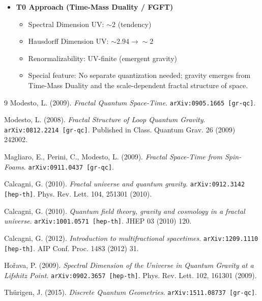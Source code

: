 \begin{itemize}
		\item \textbf{T0 Approach (Time-Mass Duality / FGFT)}
		\begin{itemize}
			\item Spectral Dimension UV: $\sim 2$ (tendency)
			\item Hausdorff Dimension UV: $\sim 2.94 \rightarrow \sim 2$
			\item Renormalizability: UV-finite (emergent gravity)
			\item Special feature: No separate quantization needed; gravity emerges from Time-Mass Duality and the scale-dependent fractal structure of space.
		\end{itemize}
	\end{itemize}
	\begin{thebibliography}{9}
	Modesto, L. (2009). \textit{Fractal Quantum Space-Time}. \texttt{arXiv:0905.1665 [gr-qc]}.
	
	Modesto, L. (2008). \textit{Fractal Structure of Loop Quantum Gravity}. \texttt{arXiv:0812.2214 [gr-qc]}. Published in Class. Quantum Grav. 26 (2009) 242002.
	
	Magliaro, E., Perini, C., Modesto, L. (2009). \textit{Fractal Space-Time from Spin-Foams}. \texttt{arXiv:0911.0437 [gr-qc]}.
	
	Calcagni, G. (2010). \textit{Fractal universe and quantum gravity}. \texttt{arXiv:0912.3142 [hep-th]}. Phys. Rev. Lett. 104, 251301 (2010).
	
	Calcagni, G. (2010). \textit{Quantum field theory, gravity and cosmology in a fractal universe}. \texttt{arXiv:1001.0571 [hep-th]}. JHEP 03 (2010) 120.
	
	Calcagni, G. (2012). \textit{Introduction to multifractional spacetimes}. \texttt{arXiv:1209.1110 [hep-th]}. AIP Conf. Proc. 1483 (2012) 31.
	
	Hořava, P. (2009). \textit{Spectral Dimension of the Universe in Quantum Gravity at a Lifshitz Point}. \texttt{arXiv:0902.3657 [hep-th]}. Phys. Rev. Lett. 102, 161301 (2009).
	
	Thürigen, J. (2015). \textit{Discrete Quantum Geometries}. \texttt{arXiv:1511.08737 [gr-qc]}.
\end{thebibliography}	